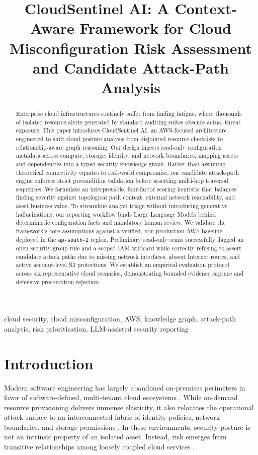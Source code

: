 \documentclass[conference]{IEEEtran}
\title{CloudSentinel AI: A Context-Aware Framework for Cloud Misconfiguration Risk Assessment and Candidate Attack-Path Analysis}
\author{\IEEEauthorblockN{Harshith}}
\begin{document}
\maketitle

\begin{abstract}
Enterprise cloud infrastructures routinely suffer from finding fatigue, where thousands of isolated resource alerts generated by standard auditing suites obscure actual threat exposure. This paper introduces CloudSentinel AI, an AWS-focused architecture engineered to shift cloud posture analysis from disjointed resource checklists to relationship-aware graph reasoning. Our design ingests read-only configuration metadata across compute, storage, identity, and network boundaries, mapping assets and dependencies into a typed security knowledge graph. Rather than assuming theoretical connectivity equates to real-world compromise, our candidate attack-path engine enforces strict precondition validation before asserting multi-hop traversal sequences. We formulate an interpretable, four-factor scoring heuristic that balances finding severity against topological path context, external network reachability, and asset business value. To streamline analyst triage without introducing generative hallucinations, our reporting workflow binds Large Language Models behind deterministic configuration facts and mandatory human review. We validate the framework's core assumptions against a verified, non-production AWS baseline deployed in the \texttt{ap-south-2} region. Preliminary read-only scans successfully flagged an open security-group rule and a scoped IAM wildcard while correctly refusing to assert candidate attack paths due to missing network interfaces, absent Internet routes, and active account-level S3 protections. We establish an empirical evaluation protocol across six representative cloud scenarios, demonstrating bounded evidence capture and defensive precondition rejection.
\end{abstract}

\begin{IEEEkeywords}
cloud security, cloud misconfiguration, AWS, knowledge graph, attack-path analysis, risk prioritisation, LLM-assisted security reporting
\end{IEEEkeywords}

\section{Introduction}
Modern software engineering has largely abandoned on-premises perimeters in favor of software-defined, multi-tenant cloud ecosystems \cite{nist2011cloud}. While on-demand resource provisioning delivers immense elasticity, it also relocates the operational attack surface to an interconnected fabric of identity policies, network boundaries, and storage permissions \cite{alouffi2021cloudsecurity,kumar2019cloudsecurity}. In these environments, security posture is not an intrinsic property of an isolated asset. Instead, risk emerges from transitive relationships among loosely coupled cloud services \cite{torkura2021multicloud,saxena2021multicloud}.
\end{document}
